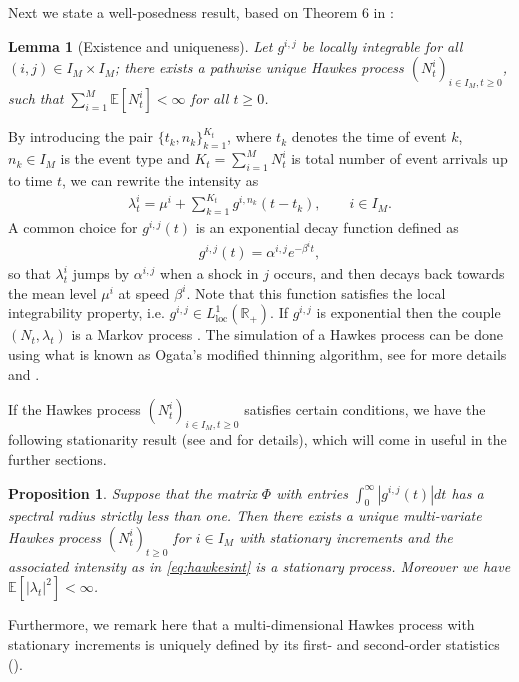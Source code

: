 \documentclass[10pt]{article}
\theoremstyle{plain}
\newtheorem{lemma}[theorem]{Lemma}                              %
\newtheorem{proposition}[theorem]{Proposition}
\theoremstyle{definition}
\newcommand{\<}{\langle}
\renewcommand{\>}{\rangle}
\renewcommand{\(}{\left(}
\renewcommand{\)}{\right)}
\renewcommand{\[}{\left[}
\renewcommand{\]}{\right]}
\begin{document}
Next we state a well-posedness result, based on Theorem 6 in \citet{delattre16}:
\begin{lemma}[Existence and uniqueness]\label{exist} Let $g^{i,j}$ be locally integrable for all $(i,j)\in I_{M} \times I_{M}$;
there exists a pathwise unique Hawkes process $(N_t^i)_{i\in I_{M},t\geq 0}$, such that
$\sum\limits_{i=1}^M\mathbb{E}[N_t^i]<\infty$ for all $t\geq 0$.
\end{lemma}

By introducing the pair $\{t_k, n_k\}_{k=1}^{K_t}$, where $t_k$ denotes the time of event $k$,
$n_k\in I_{M}$ is the event type and $K_t=\sum\limits_{i=1}^M N_t^i$ is total number of event
arrivals up to time $t$, we can rewrite the intensity as
\begin{align*}
\lambda^i_t = \mu^i + \sum\limits_{k=1}^{K_t}g^{i,n_k}(t-t_k), \qquad i \in I_M.
\end{align*}
A common choice for $g^{i,j}(t)$ is an exponential decay function defined as
\begin{align}\label{eq:expjump}
g^{i,j}(t) = \alpha^{i,j}e^{-\beta^i t},
\end{align}
so that $\lambda^i_t$ jumps by $\alpha^{i,j}$ when a shock in $j$ occurs, and then decays back
towards the mean level $\mu^i$ at speed $\beta^i$. Note that this function satisfies the local
integrability property, i.e. $g^{i,j}\in L^1_{\text{loc}}(\mathbb{R}_+)$. If $g^{i,j}$ is
exponential then the couple $(N_t,\lambda_t)$ is a Markov process \cite{bacry15}. The simulation of a Hawkes
process can be done using what is known as Ogata's modified thinning algorithm, see for more details \citet{ogata81} and \citet{daley07}.

If the Hawkes process $(N_t^i)_{i\in I_{M},t\geq 0}$ satisfies certain conditions, we have
the following stationarity result (see \citet{bremaud96} and \citet{bacry14} for details), which
will come in useful in the further sections.
\begin{proposition} \label{nonexpl}
Suppose that the matrix $\Phi$ with entries $\int_0^\infty |g^{i,j}(t)|dt$ has a spectral radius strictly less than one.  %
Then there exists a unique multi-variate Hawkes process $(N^i_t)_{t\geq 0}$ for $i\in  I_{M}$ with
stationary increments and the associated intensity as in \eqref{eq:hawkesint} is a stationary
process. Moreover we have %
$\mathbb{E}[|\lambda_t|^2]< \infty$.
\end{proposition}
Furthermore, we remark here that a multi-dimensional Hawkes process with stationary increments is uniquely defined by its first- and second-order statistics (\citet{bacry14}).
\end{document}
